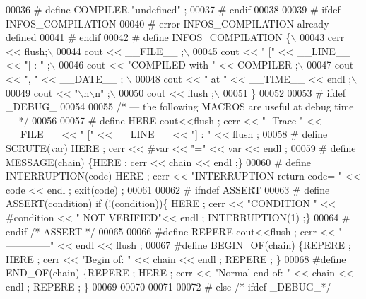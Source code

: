 \begin{DoxyCode}
00036 \textcolor{preprocessor}{# define COMPILER       "undefined" ;}
00037 \textcolor{preprocessor}{# endif}
00038 
00039 \textcolor{preprocessor}{# ifdef INFOS\_COMPILATION}
00040 \textcolor{preprocessor}{# error INFOS\_COMPILATION already defined}
00041 \textcolor{preprocessor}{# endif}
00042 \textcolor{preprocessor}{# define INFOS\_COMPILATION  \{\(\backslash\)}
00043 \textcolor{preprocessor}{                    cerr << flush;\(\backslash\)}
00044 \textcolor{preprocessor}{                    cout << \_\_FILE\_\_ ;\(\backslash\)}
00045 \textcolor{preprocessor}{                    cout << " [" << \_\_LINE\_\_ << "] : " ;\(\backslash\)}
00046 \textcolor{preprocessor}{                    cout << "COMPILED with " << COMPILER ;\(\backslash\)}
00047 \textcolor{preprocessor}{                    cout << ", " << \_\_DATE\_\_ ; \(\backslash\)}
00048 \textcolor{preprocessor}{                    cout << " at " << \_\_TIME\_\_ << endl ;\(\backslash\)}
00049 \textcolor{preprocessor}{                    cout << "\(\backslash\)n\(\backslash\)n" ;\(\backslash\)}
00050 \textcolor{preprocessor}{                    cout << flush ;\(\backslash\)}
00051 \textcolor{preprocessor}{                \}}
00052 
00053 \textcolor{preprocessor}{# ifdef \_DEBUG\_}
00054 
00055 \textcolor{comment}{/* --- the following MACROS are useful at debug time --- */}
00056 
00057 \textcolor{preprocessor}{# define HERE cout<<flush ; cerr << "- Trace " << \_\_FILE\_\_ << " [" << \_\_LINE\_\_ << "] : " << flush ;}
00058 \textcolor{preprocessor}{# define SCRUTE(var) HERE ; cerr << #var << "=" << var << endl ;}
00059 \textcolor{preprocessor}{# define MESSAGE(chain) \{HERE ; cerr << chain << endl ;\}}
00060 \textcolor{preprocessor}{# define INTERRUPTION(code) HERE ; cerr << "INTERRUPTION return code= " << code << endl ; exit(code) ;}
00061 
00062 \textcolor{preprocessor}{# ifndef ASSERT}
00063 \textcolor{preprocessor}{# define ASSERT(condition) if (!(condition))\{ HERE ; cerr << "CONDITION " << #condition << " NOT
       VERIFIED"<< endl ; INTERRUPTION(1) ;\}}
00064 \textcolor{preprocessor}{# endif }\textcolor{comment}{/* ASSERT */}\textcolor{preprocessor}{}
00065 
00066 \textcolor{preprocessor}{#define REPERE cout<<flush ; cerr << "   --------------" << endl << flush ;}
00067 \textcolor{preprocessor}{#define BEGIN\_OF(chain) \{REPERE ; HERE ; cerr << "Begin of: " << chain << endl ; REPERE ; \}}
00068 \textcolor{preprocessor}{#define END\_OF(chain) \{REPERE ; HERE ; cerr << "Normal end of: " << chain << endl ; REPERE ; \}}
00069 
00070 
00071 
00072 \textcolor{preprocessor}{# else }\textcolor{comment}{/* ifdef \_DEBUG\_*/}\textcolor{preprocessor}{}

\end{DoxyCode}
